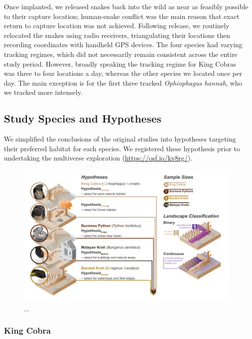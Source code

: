 \documentclass[10pt,a4paper]{article}
\begin{document}
Once implanted, we released snakes back into the wild as near as feasibly possible to their capture location; human-snake conflict was the main reason that exact return to capture location was not achieved.
Following release, we routinely relocated the snakes using radio receivers, triangulating their locations then recording coordinates with handheld GPS devices.
The four species had varying tracking regimes, which did not necessarily remain consistent across the entire study period.
However, broadly speaking the tracking regime for King Cobras was three to four locations a day, whereas the other species we located once per day.
The main exception is for the first three tracked \emph{Ophiophagus hannah}, who we tracked more intensely.

\subsection{Study Species and Hypotheses}\label{study-species-and-hypotheses}

We simplified the conclusions of the original studies into hypotheses targeting their preferred habitat for each species.
We registered these hypothesis prior to undertaking the multiverse exploration (\url{https://osf.io/kv8rg/}).

\begin{figure}
\includegraphics[width=1\linewidth]{../ext_images/hypothesis_visual} \caption{...}\label{fig:hypothesesFigure}
\end{figure}

\subsubsection{King Cobra}\label{king-cobra}
\end{document}
